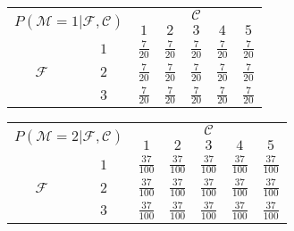 \documentclass[preview]{standalone}
\newcommand{\M}{\mathcal{M}}
\newcommand{\F}{\mathcal{F}}
\newcommand{\C}{\mathcal{C}}
\begin{document}
	\begin{tabular}{|c|c|c|c|c|c|c|}
		\hline
		\multicolumn{2}{|c|}{\multirow{2}{*}{$P(\M = 1|\F,\C)$}} &                             \multicolumn{5}{c|}{$\C$}                              \\ \cline{3-7}
		\multicolumn{2}{|c|}{}                                   &      $1$       &      $2$       &      $3$       &      $4$       &      $5$       \\ \hline
		\multirow{3}{*}{$\F$} &               $1$                & $\frac{7}{20}$ & $\frac{7}{20}$ & $\frac{7}{20}$ & $\frac{7}{20}$ & $\frac{7}{20}$ \\ \cline{2-7}
		                      &               $2$                & $\frac{7}{20}$ & $\frac{7}{20}$ & $\frac{7}{20}$ & $\frac{7}{20}$ & $\frac{7}{20}$ \\ \cline{2-7}
		                      &               $3$                & $\frac{7}{20}$ & $\frac{7}{20}$ & $\frac{7}{20}$ & $\frac{7}{20}$ & $\frac{7}{20}$ \\ \hline
	\end{tabular}
	\hspace{0.5\mytextsize}
	\begin{tabular}{|c|c|c|c|c|c|c|}
		\hline
		\multicolumn{2}{|c|}{\multirow{2}{*}{$P(\M = 2|\F,\C)$}} &                                  \multicolumn{5}{c|}{$\C$}                                   \\ \cline{3-7}
		\multicolumn{2}{|c|}{}                                   &       $1$        &       $2$        &       $3$        &       $4$        &       $5$        \\ \hline
		\multirow{3}{*}{$\F$} &               $1$                & $\frac{37}{100}$ & $\frac{37}{100}$ & $\frac{37}{100}$ & $\frac{37}{100}$ & $\frac{37}{100}$ \\ \cline{2-7}
		                      &               $2$                & $\frac{37}{100}$ & $\frac{37}{100}$ & $\frac{37}{100}$ & $\frac{37}{100}$ & $\frac{37}{100}$ \\ \cline{2-7}
		                      &               $3$                & $\frac{37}{100}$ & $\frac{37}{100}$ & $\frac{37}{100}$ & $\frac{37}{100}$ & $\frac{37}{100}$ \\ \hline
	\end{tabular}
	\vspace{1\mytextsize} \newline
\end{document}
